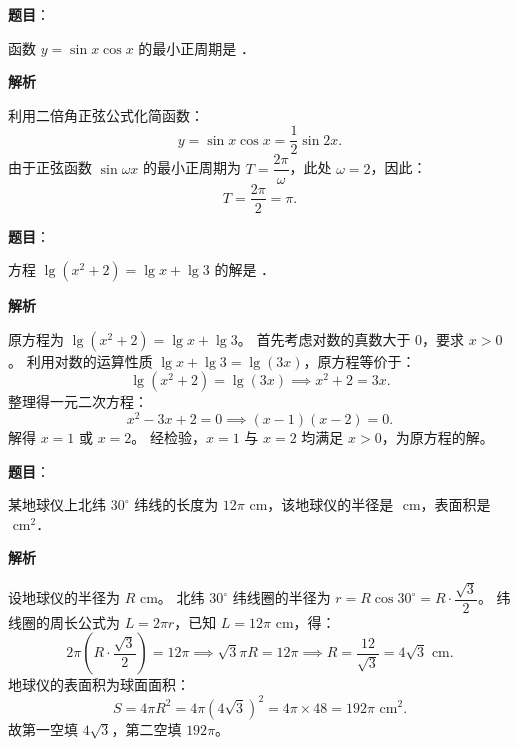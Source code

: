 \begin{answer}

\textbf{题目}：

函数 $y=\sin x\cos x$ 的最小正周期是 \underline{\hspace{3em}}．

\textbf{解析}

利用二倍角正弦公式化简函数：
\nopagebreak[4]
\[
y=\sin x\cos x=\frac{1}{2}\sin 2x.
\]
由于正弦函数 $\sin\omega x$ 的最小正周期为 $T=\dfrac{2\pi}{\omega}$，此处 $\omega=2$，因此：
\nopagebreak[4]
\[
T=\frac{2\pi}{2}=\pi.
\]


\end{answer}
\begin{answer}

\textbf{题目}：

方程 $\lg(x^2+2)=\lg x+\lg 3$ 的解是 \underline{\hspace{3em}}．

\textbf{解析}

原方程为 $\lg(x^2+2)=\lg x+\lg 3$。
首先考虑对数的真数大于 0，要求 $x>0$。
利用对数的运算性质 $\lg x+\lg 3=\lg(3x)$，原方程等价于：
\nopagebreak[4]
\[
\lg(x^2+2)=\lg(3x)\implies x^2+2=3x.
\]
整理得一元二次方程：
\nopagebreak[4]
\[
x^2-3x+2=0\implies (x-1)(x-2)=0.
\]
解得 $x=1$ 或 $x=2$。
经检验，$x=1$ 与 $x=2$ 均满足 $x>0$，为原方程的解。


\end{answer}
\begin{answer}

\textbf{题目}：

某地球仪上北纬 $30^\circ$ 纬线的长度为 $12\pi\text{ cm}$，该地球仪的半径是 \underline{\hspace{3em}}$\text{ cm}$，表面积是 \underline{\hspace{3em}}$\text{ cm}^2$．

\textbf{解析}

设地球仪的半径为 $R\text{ cm}$。
北纬 $30^\circ$ 纬线圈的半径为 $r=R\cos 30^\circ=R\cdot\dfrac{\sqrt{3}}{2}$。
纬线圈的周长公式为 $L=2\pi r$，已知 $L=12\pi\text{ cm}$，得：
\nopagebreak[4]
\[
2\pi\left(R\cdot\frac{\sqrt{3}}{2}\right)=12\pi\implies \sqrt{3}\pi R=12\pi\implies R=\frac{12}{\sqrt{3}}=4\sqrt{3}\text{ cm}.
\]
地球仪的表面积为球面面积：
\nopagebreak[4]
\[
S=4\pi R^2=4\pi(4\sqrt{3})^2=4\pi\times 48=192\pi\text{ cm}^2.
\]
故第一空填 $4\sqrt{3}$，第二空填 $192\pi$。


\end{answer}
